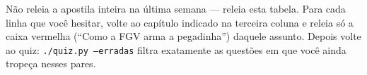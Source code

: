 \begin{comosair}
Não releia a apostila inteira na última semana --- releia esta tabela. Para
cada linha que você hesitar, volte ao capítulo indicado na terceira coluna e
releia só a caixa vermelha (``Como a FGV arma a pegadinha'') daquele
assunto. Depois volte ao quiz: \texttt{./quiz.py --erradas} filtra
exatamente as questões em que você ainda tropeça nesses pares.
\end{comosair}
